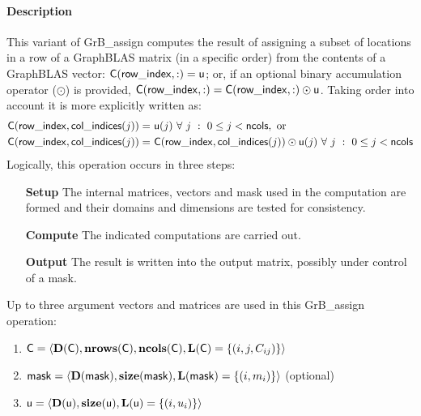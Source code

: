 \paragraph{Description}

This variant of {\sf GrB\_assign} computes the result of assigning a subset of
locations in a row of a GraphBLAS matrix (in a specific order) from the 
contents of a GraphBLAS vector: 
${\sf C}({\sf row\_index},:) = {\sf u}$; or, if an 
optional binary accumulation operator ($\odot$) is provided, 
${\sf C}({\sf row\_index},:) = 
{\sf C}({\sf row\_index},:) \odot {\sf u}$. Taking order into account it is
more explicitly written as:
\[
\begin{aligned}
    {\sf C}({\sf row\_index},{\sf col\_indices}(j)) = &\ {\sf u}(j) 
    \ \forall \ j \ : \ 0 \leq j < {\sf ncols}, \mbox{~or~}
    \\
    {\sf C}({\sf row\_index},{\sf col\_indices}(j)) = &\ {\sf C}({\sf row\_index},{\sf col\_indices}(j)) \odot {\sf u}(j) 
    \ \forall \ j \ : \ 0 \leq j < {\sf ncols}
\end{aligned}
\]  
Logically, this operation occurs in three steps:
\begin{enumerate}[leftmargin=0.75in]
\item[\bf Setup] The internal matrices, vectors and mask used in the computation are formed 
and their domains and dimensions are tested for consistency.
\item[\bf Compute] The indicated computations are carried out.
\item[\bf Output] The result is written into the output matrix, possibly under 
control of a mask.
\end{enumerate}

Up to three argument vectors and matrices are used in this {\sf GrB\_assign} 
operation:
\begin{enumerate}
	\item ${\sf C} = \langle \bold{D}({\sf C}),\bold{nrows}({\sf C}),
    \bold{ncols}({\sf C}),\bold{L}({\sf C}) = \{(i,j,C_{ij}) \} \rangle$
    
	\item ${\sf mask} = \langle \bold{D}({\sf mask}),\bold{size}({\sf mask}),
    \bold{L}({\sf mask}) = \{(i,m_{i}) \} \rangle$ (optional)

	\item ${\sf u} = \langle \bold{D}({\sf u}),\bold{size}({\sf u}),
    \bold{L}({\sf u}) = \{(i,u_i) \} \rangle$
\end{enumerate}

